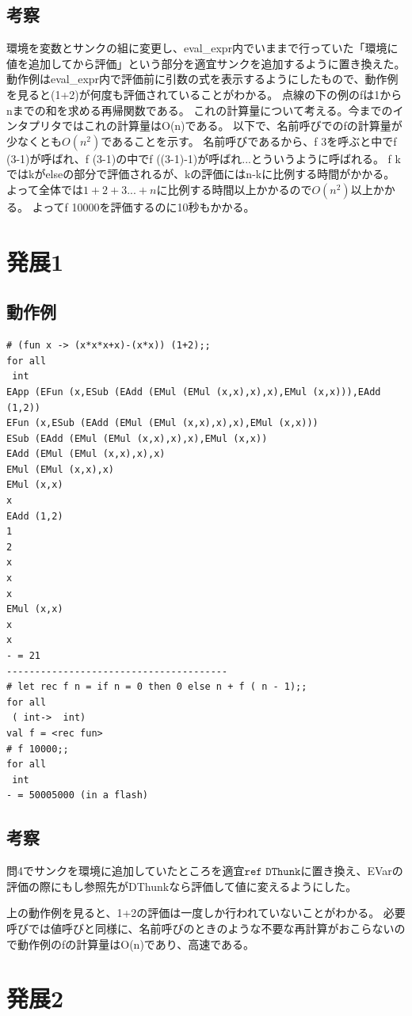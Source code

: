 \documentclass[11pt,a4paper]{jsarticle}
\begin{document}
\subsection*{考察}
環境を変数とサンクの組に変更し、eval\_expr内でいままで行っていた「環境に値を追加してから評価」という部分を適宜サンクを追加するように置き換えた。
動作例はeval\_expr内で評価前に引数の式を表示するようにしたもので、動作例を見ると(1+2)が何度も評価されていることがわかる。
点線の下の例のfは1からnまでの和を求める再帰関数である。
これの計算量について考える。今までのインタプリタではこれの計算量はO(n)である。
以下で、名前呼びでのfの計算量が少なくとも$O(n^2)$であることを示す。
名前呼びであるから、f 3を呼ぶと中でf (3-1)が呼ばれ、f (3-1)の中でf ((3-1)-1)が呼ばれ...とういうように呼ばれる。
f kではkがelseの部分で評価されるが、kの評価にはn-kに比例する時間がかかる。よって全体では$1+2+3...+n$に比例する時間以上かかるので$O(n^2)$以上かかる。
よってf 10000を評価するのに10秒もかかる。
\section*{発展1}
\subsection*{動作例}
\begin{lstlisting}[basicstyle=\ttfamily\footnotesize, frame=single]
# (fun x -> (x*x*x+x)-(x*x)) (1+2);; 
for all 
 int
EApp (EFun (x,ESub (EAdd (EMul (EMul (x,x),x),x),EMul (x,x))),EAdd (1,2))
EFun (x,ESub (EAdd (EMul (EMul (x,x),x),x),EMul (x,x)))
ESub (EAdd (EMul (EMul (x,x),x),x),EMul (x,x))
EAdd (EMul (EMul (x,x),x),x)
EMul (EMul (x,x),x)
EMul (x,x)
x
EAdd (1,2)
1
2
x
x
x
EMul (x,x)
x
x
- = 21
---------------------------------------
# let rec f n = if n = 0 then 0 else n + f ( n - 1);;
for all 
 ( int->  int)
val f = <rec fun>
# f 10000;;
for all 
 int
- = 50005000 (in a flash)
\end{lstlisting}
\subsection*{考察}
問4でサンクを環境に追加していたところを適宜$\texttt{ref DThunk}$に置き換え、EVarの評価の際にもし参照先がDThunkなら評価して値に変えるようにした。\par
上の動作例を見ると、1+2の評価は一度しか行われていないことがわかる。
必要呼びでは値呼びと同様に、名前呼びのときのような不要な再計算がおこらないので動作例のfの計算量はO(n)であり、高速である。
\section*{発展2}
\end{document}
